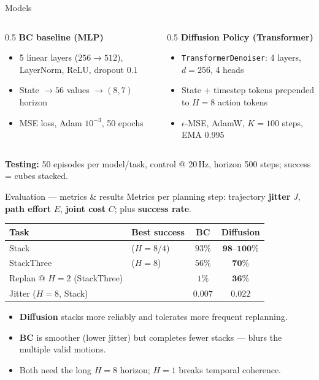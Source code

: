 \documentclass[aspectratio=169,11pt]{beamer}
\newcommand{\BC}{\textcolor{bcblue}{\textbf{BC}}}
\newcommand{\DP}{\textcolor{dpred}{\textbf{Diffusion}}}
\begin{document}
\begin{frame}{Models}
  \begin{columns}[T]
    \begin{column}{0.5\textwidth}
      \textbf{\BC{} baseline (MLP)}
      \begin{itemize}
        \item 5 linear layers ($256\to512$), LayerNorm, ReLU, dropout $0.1$
        \item State $\to 56$ values $\to (8,7)$ horizon
        \item MSE loss, Adam $10^{-3}$, 50 epochs
      \end{itemize}
    \end{column}
    \begin{column}{0.5\textwidth}
      \textbf{\DP{} Policy (Transformer)}
      \begin{itemize}
        \item \texttt{TransformerDenoiser}: 4 layers, $d{=}256$, 4 heads
        \item State + timestep tokens prepended to $H{=}8$ action tokens
        \item $\epsilon$-MSE, AdamW, $K{=}100$ steps, EMA $0.995$
      \end{itemize}
    \end{column}
  \end{columns}
  \vfill
  \textbf{Testing:} 50 episodes per model/task, control @ 20\,Hz, horizon 500 steps; success = cubes stacked.
\end{frame}


\begin{frame}{Evaluation — metrics \& results}
  Metrics per planning step: trajectory \textbf{jitter} $J$, \textbf{path effort} $E$, \textbf{joint cost} $C$; plus \textbf{success rate}.
  \begin{table}\centering\small
    \begin{tabular}{@{}llcc@{}}
      \toprule
      Task & Best success & \BC{} & \DP{} \\
      \midrule
      Stack       & ($H{=}8$/$4$) & $93\%$ & $\mathbf{98\text{--}100\%}$ \\
      StackThree  & ($H{=}8$)     & $56\%$ & $\mathbf{70\%}$ \\
      \midrule
      Replan @ $H{=}2$ (StackThree) & & $1\%$ & $\mathbf{36\%}$ \\
      Jitter ($H{=}8$, Stack)       & & $\mathbf{0.007}$ & $0.022$ \\
      \bottomrule
    \end{tabular}
  \end{table}
  \begin{itemize}
    \item \DP{} stacks more reliably and tolerates more frequent replanning.
    \item \BC{} is smoother (lower jitter) but completes fewer stacks — blurs the multiple valid motions.
    \item Both need the long $H{=}8$ horizon; $H{=}1$ breaks temporal coherence.
  \end{itemize}
\end{frame}
\end{document}
